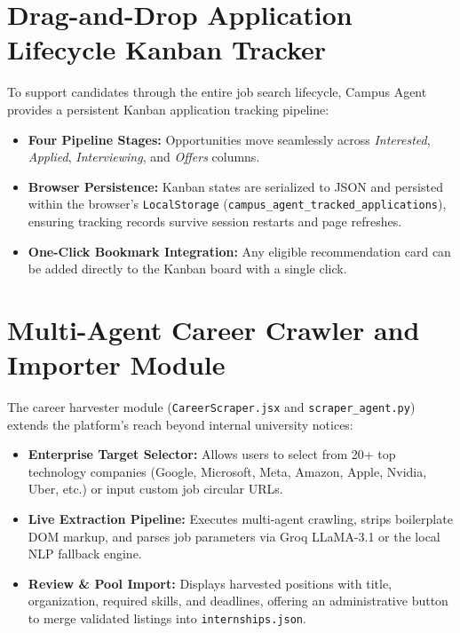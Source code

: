 \section{Drag-and-Drop Application Lifecycle Kanban Tracker} \label{S5.7}
To support candidates through the entire job search lifecycle, Campus Agent provides a persistent Kanban application tracking pipeline:
\begin{itemize}
	\item \textbf{Four Pipeline Stages:} Opportunities move seamlessly across \textit{Interested}, \textit{Applied}, \textit{Interviewing}, and \textit{Offers} columns.
	\item \textbf{Browser Persistence:} Kanban states are serialized to JSON and persisted within the browser's \texttt{LocalStorage} (\texttt{campus\_agent\_tracked\_applications}), ensuring tracking records survive session restarts and page refreshes.
	\item \textbf{One-Click Bookmark Integration:} Any eligible recommendation card can be added directly to the Kanban board with a single click.
\end{itemize}

\section{Multi-Agent Career Crawler and Importer Module} \label{S5.8}
The career harvester module (\texttt{CareerScraper.jsx} and \texttt{scraper\_agent.py}) extends the platform's reach beyond internal university notices:
\begin{itemize}
	\item \textbf{Enterprise Target Selector:} Allows users to select from 20+ top technology companies (Google, Microsoft, Meta, Amazon, Apple, Nvidia, Uber, etc.) or input custom job circular URLs.
	\item \textbf{Live Extraction Pipeline:} Executes multi-agent crawling, strips boilerplate DOM markup, and parses job parameters via Groq LLaMA-3.1 or the local NLP fallback engine.
	\item \textbf{Review \& Pool Import:} Displays harvested positions with title, organization, required skills, and deadlines, offering an administrative button to merge validated listings into \texttt{internships.json}.
\end{itemize}


